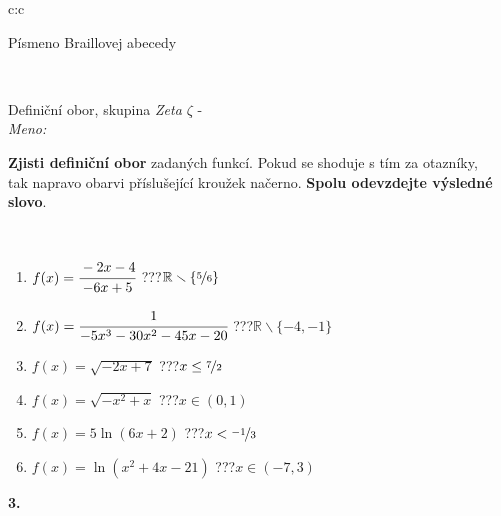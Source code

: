\documentclass[10pt]{report}
\begin{document}
\begin{tabular}{c:c}
\begin{minipage}[c][104.5mm][t]{0.5\linewidth}
\begin{center}
\begin{minipage}{0.20\linewidth}
\begin{center}
{\small Písmeno Braillovej abecedy}
\end{center}
\end{minipage}
\end{center}
\end{minipage}
\\ \hdashline
\begin{minipage}[c][104.5mm][t]{0.5\linewidth}
\begin{center}
\vspace{7mm}
{\huge Definiční obor, skupina \textit{Zeta $\zeta$} -}\\[5mm]
\textit{Meno:}\phantom{xxxxxxxxxxxxxxxxxxxxxxxxxxxxxxxxxxxxxxxxxxxxxxxxxxxxxxxxxxxxxxxxx}\\[5mm]
\begin{minipage}{0.95\linewidth}
\textbf{Zjisti definiční obor} zadaných funkcí. Pokud se shoduje s tím za otazníky,\\tak napravo obarvi příslušející kroužek načerno. \textbf{Spolu odevzdejte výsledné slovo}.
\end{minipage}
\\[1mm]
\begin{minipage}{0.79\linewidth}
\begin{center}
\begin{varwidth}{\linewidth}
\begin{enumerate}
\normalsizerrr
\item $f(x)=\cfrac{-2x-4}{-6x+5}$\quad \dotfill\; ???\;\dotfill \quad $\mathbb{R}\smallsetminus\{\nicefrac{5}{6}\}$
\item $f(x)=\cfrac{1}{-5x^3-30x^2-45x-20}$\quad \dotfill\; ???\;\dotfill \quad $\mathbb{R}\smallsetminus\{-4,-1\}$
\item $f(x)=\sqrt{-2x+7}$\quad \dotfill\; ???\;\dotfill \quad $x\leq\nicefrac{7}{2}$
\item $f(x)=\sqrt{-x^2+x}$\quad \dotfill\; ???\;\dotfill \quad $x\in(0 , 1)$
\item $f(x)=5\ln{(6x+2)}$\quad \dotfill\; ???\;\dotfill \quad $x<\nicefrac{-1}{3}$
\item $f(x)=\ln{(x^2+4x-21)}$\quad \dotfill\; ???\;\dotfill \quad $x\in(-7 , 3)$
\end{enumerate}
\end{varwidth}
\end{center}
\end{minipage}
\begin{minipage}{0.20\linewidth}
\begin{center}
{\Huge\bfseries 3.} \\[2mm]

\end{center}
\end{minipage}
\end{center}
\end{minipage}
\end{tabular}
\end{document}
